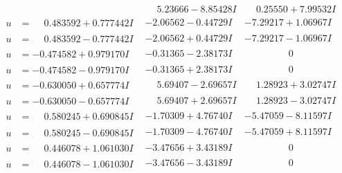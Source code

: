 \documentclass[1p]{elsarticle_modified}
\theoremstyle{definition}
\begin{document}
$$\begin{array}{c|c|c}
 & \phantom{-}5.23666 - 8.85428 I & \phantom{-}0.25550 + 7.99532 I \\ \hline\begin{aligned}
u &= \phantom{-}0.483592 + 0.777442 I\end{aligned}
 & -2.06562 - 0.44729 I & -7.29217 + 1.06967 I \\ \hline\begin{aligned}
u &= \phantom{-}0.483592 - 0.777442 I\end{aligned}
 & -2.06562 + 0.44729 I & -7.29217 - 1.06967 I \\ \hline\begin{aligned}
u &= -0.474582 + 0.979170 I\end{aligned}
 & -0.31365 - 2.38173 I & \phantom{-0.000000 } 0 \\ \hline\begin{aligned}
u &= -0.474582 - 0.979170 I\end{aligned}
 & -0.31365 + 2.38173 I & \phantom{-0.000000 } 0 \\ \hline\begin{aligned}
u &= -0.630050 + 0.657774 I\end{aligned}
 & \phantom{-}5.69407 - 2.69657 I & \phantom{-}1.28923 + 3.02747 I \\ \hline\begin{aligned}
u &= -0.630050 - 0.657774 I\end{aligned}
 & \phantom{-}5.69407 + 2.69657 I & \phantom{-}1.28923 - 3.02747 I \\ \hline\begin{aligned}
u &= \phantom{-}0.580245 + 0.690845 I\end{aligned}
 & -1.70309 + 4.76740 I & -5.47059 - 8.11597 I \\ \hline\begin{aligned}
u &= \phantom{-}0.580245 - 0.690845 I\end{aligned}
 & -1.70309 - 4.76740 I & -5.47059 + 8.11597 I \\ \hline\begin{aligned}
u &= \phantom{-}0.446078 + 1.061030 I\end{aligned}
 & -3.47656 + 3.43189 I & \phantom{-0.000000 } 0 \\ \hline\begin{aligned}
u &= \phantom{-}0.446078 - 1.061030 I\end{aligned}
 & -3.47656 - 3.43189 I & \phantom{-0.000000 } 0 \\ \hline\begin{aligned}

\end{aligned}
\end{array}$$
\end{document}
